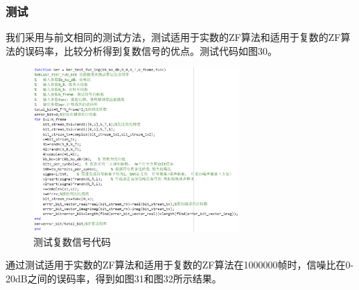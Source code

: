 \documentclass[a4paper,12pt]{article}
\begin{document}
	\subsubsection{测试}
	我们采用与前文相同的测试方法，测试适用于实数的ZF算法和适用于复数的ZF算法的误码率，比较分析得到复数信号的优点。测试代码如图30。\par 
	\begin{figure}[h]
		\centering
		\includegraphics[width=0.7\textwidth]{31.png}
		\caption{测试复数信号代码}
	\end{figure}
	通过测试适用于实数的ZF算法和适用于复数的ZF算法在1000000帧时，信噪比在0-20dB之间的误码率，得到如图31和图32所示结果。
\end{document}
